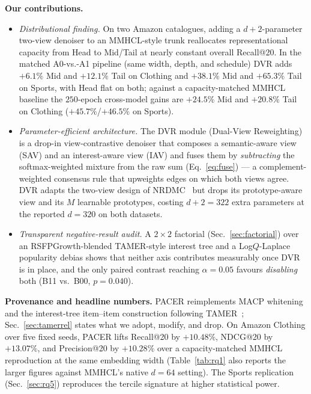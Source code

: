 \documentclass[conference]{IEEEtran}
\newcommand{\dvr}{DVR\xspace}
\begin{document}
\smallskip
\noindent\textbf{Our contributions.}
\begin{itemize}[leftmargin=1.2em,itemsep=2pt,topsep=3pt,parsep=0pt]
  \item \emph{Distributional finding.} On two Amazon catalogues,
        adding a $d{+}2$-parameter two-view denoiser to an
        MMHCL-style trunk reallocates representational capacity from
        Head to Mid/Tail at nearly constant overall Recall@20. In the
        matched A0-vs.-A1 pipeline (same width, depth, and schedule)
        \dvr adds $+6.1\%$ Mid and $+12.1\%$ Tail on Clothing and
        $+38.1\%$ Mid and $+65.3\%$ Tail on Sports, with Head flat on
        both; against a capacity-matched MMHCL baseline the
        $250$-epoch cross-model gains are $+24.5\%$ Mid and
        $+20.8\%$ Tail on Clothing ($+45.7\%$/$+46.5\%$ on Sports).
  \item \emph{Parameter-efficient architecture.} The \dvr module
        (Dual-View Reweighting) is a drop-in view-contrastive
        denoiser that composes a semantic-aware view (SAV) and an
        interest-aware view (IAV) and fuses them by
        \emph{subtracting} the softmax-weighted mixture from the raw
        sum (Eq.~\ref{eq:fuse}) --- a complement-weighted consensus
        rule that upweights edges on which both views agree.
        \dvr adapts the two-view design of NRDMC~\cite{gong2026noise} but
        drops its prototype-aware view and its $M$ learnable
        prototypes, costing $d{+}2=322$ extra parameters at the
        reported $d{=}320$ on both datasets.
  \item \emph{Transparent negative-result audit.} A $2{\times}2$
        factorial (Sec.~\ref{sec:factorial}) over an
        RSFPGrowth-blended TAMER-style interest tree and a
        Log$Q$-Laplace popularity debias shows that neither axis
        contributes measurably once \dvr is in place, and the only
        paired contrast reaching $\alpha{=}0.05$ favours
        \emph{disabling} both (B11 vs.\ B00, $p{=}0.040$).
\end{itemize}

\smallskip
\noindent\textbf{Provenance and headline numbers.} PACER reimplements
MACP whitening and the interest-tree item--item
construction following TAMER~\cite{meng2025tamer};
Sec.~\ref{sec:tamerrel} states what we adopt, modify, and drop. On
Amazon Clothing over five fixed seeds,
PACER lifts Recall@20 by $+10.48\%$, NDCG@20 by $+13.07\%$, and
Precision@20 by $+10.28\%$ over a capacity-matched MMHCL reproduction
at the same embedding width (Table~\ref{tab:rq1} also reports the
larger figures against MMHCL's native $d{=}64$ setting). The Sports
replication
(Sec.~\ref{sec:rq5}) reproduces the tercile signature at higher
statistical power.
\end{document}
